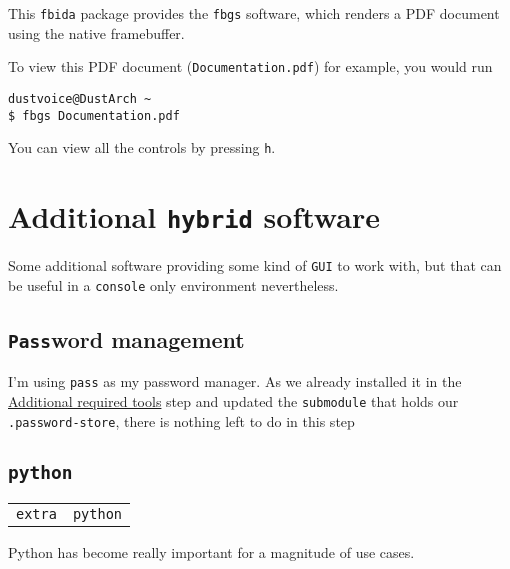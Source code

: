 \documentclass[9pt]{report}
\newenvironment{NOTE}
{\begin{tcolorbox}[colback=admonitionBG,coltitle=draculaFG,colframe=draculaBlue,colbacktitle=draculaBlue,title=NOTE]}
{\end{tcolorbox}}
\newenvironment{packagetable}
{\begin{longtabu}to \textwidth [b]{X[1,r]|X[1,l]}}
{\end{longtabu}}
\begin{document}
This \texttt{fbida} package provides the \texttt{fbgs} software, which renders a PDF document using the native framebuffer.


To view this PDF document (\texttt{Documentation.pdf}) for example, you would run


\begin{verbatim}
dustvoice@DustArch ~
$ fbgs Documentation.pdf
\end{verbatim}

\begin{NOTE}
    You can view all the controls by pressing \texttt{h}.

\end{NOTE}

\newpage

\hypertarget{x-additional-hybrid-software}{\section{Additional \texttt{hybrid} software}}
Some additional software providing some kind of \texttt{GUI} to work with, but that can be useful in a \texttt{console} only environment nevertheless.



\newpage

\hypertarget{x-password-management}{\subsection{\texttt{Pass}word management}}
I’m using \texttt{pass} as my password manager.
As we already installed it in the \hyperlink{additional-tools-setup-home}{Additional required tools} step and updated the \texttt{submodule} that holds our \texttt{.password-store}, there is nothing left to do in this step



\newpage

\hypertarget{x-python}{\subsection{\texttt{python}}}
\begin{packagetable}
    \texttt{extra} & \texttt{python} \\ 
\end{packagetable}

Python has become really important for a magnitude of use cases.



\newpage
\end{document}
